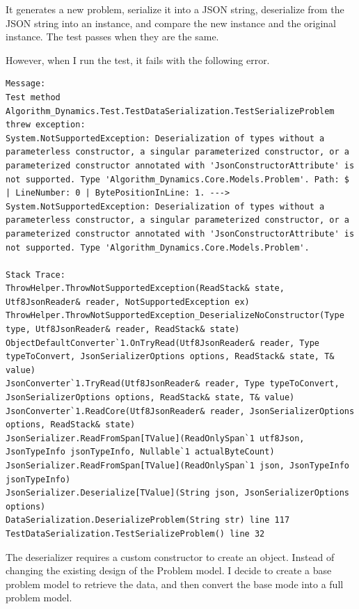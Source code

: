 \documentclass[a4paper]{report}
\begin{document}
It generates a new problem, serialize it into a JSON string, deserialize from the JSON string into an instance, and compare the new instance and the original instance. The test passes when they are the same.

However, when I run the test, it fails with the following error.

\begin{verbatim}
Message: 
Test method Algorithm_Dynamics.Test.TestDataSerialization.TestSerializeProblem threw exception: 
System.NotSupportedException: Deserialization of types without a parameterless constructor, a singular parameterized constructor, or a parameterized constructor annotated with 'JsonConstructorAttribute' is not supported. Type 'Algorithm_Dynamics.Core.Models.Problem'. Path: $ | LineNumber: 0 | BytePositionInLine: 1. ---> System.NotSupportedException: Deserialization of types without a parameterless constructor, a singular parameterized constructor, or a parameterized constructor annotated with 'JsonConstructorAttribute' is not supported. Type 'Algorithm_Dynamics.Core.Models.Problem'.

Stack Trace: 
ThrowHelper.ThrowNotSupportedException(ReadStack& state, Utf8JsonReader& reader, NotSupportedException ex)
ThrowHelper.ThrowNotSupportedException_DeserializeNoConstructor(Type type, Utf8JsonReader& reader, ReadStack& state)
ObjectDefaultConverter`1.OnTryRead(Utf8JsonReader& reader, Type typeToConvert, JsonSerializerOptions options, ReadStack& state, T& value)
JsonConverter`1.TryRead(Utf8JsonReader& reader, Type typeToConvert, JsonSerializerOptions options, ReadStack& state, T& value)
JsonConverter`1.ReadCore(Utf8JsonReader& reader, JsonSerializerOptions options, ReadStack& state)
JsonSerializer.ReadFromSpan[TValue](ReadOnlySpan`1 utf8Json, JsonTypeInfo jsonTypeInfo, Nullable`1 actualByteCount)
JsonSerializer.ReadFromSpan[TValue](ReadOnlySpan`1 json, JsonTypeInfo jsonTypeInfo)
JsonSerializer.Deserialize[TValue](String json, JsonSerializerOptions options)
DataSerialization.DeserializeProblem(String str) line 117
TestDataSerialization.TestSerializeProblem() line 32
\end{verbatim}

The deserializer requires a custom constructor to create an object. Instead of changing the existing design of the Problem model. I decide to create a base problem model to retrieve the data, and then convert the base mode into a full problem model.
\end{document}
